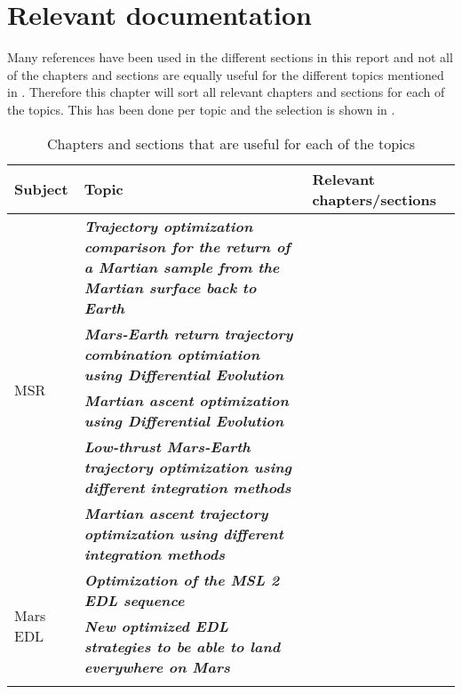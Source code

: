\chapter{Relevant documentation}
\label{ch:reldoc}
Many references have been used in the different sections in this report and not all of the chapters and sections are equally useful for the different topics mentioned in . Therefore this chapter will sort all relevant chapters and sections for each of the topics. This has been done per topic and the selection is shown in . 


\begin{longtable}{|l|p{8cm}|p{3cm}|}
\caption{Chapters and sections that are useful for each of the topics}
\label{tab:reldoc}
\endfirsthead
\endhead
\hline 
\textbf{Subject} 		& \textbf{Topic} & \textbf{Relevant chapters/sections}  \\ \hline \hline
\multirow{5}{*}{MSR} 		& \textbf{\textit{Trajectory optimization comparison for the return of a Martian sample from the Martian surface back to Earth}} & \Cref{ch:oversub,sec:srref,ch:optimization,ch:int,ch:reftrans,ch:launch,ch:transorb}  \\ \cline{2-3}
 		& \textbf{\textit{Mars-Earth return trajectory combination optimiation using Differential Evolution}} &  \Cref{ch:oversub,sec:srref,ch:optimization,ch:int,ch:reftrans,ch:launch,ch:transorb}    \\ \cline{2-3}
 		& \textbf{\textit{Martian ascent optimization using Differential Evolution}} & \Cref{ch:oversub,sec:srref,ch:optimization,ch:int,ch:reftrans,ch:launch,ch:transorb}    \\ \cline{2-3}
 		& \textbf{\textit{Low-thrust Mars-Earth trajectory optimization using different integration methods}} &  \Cref{ch:oversub,sec:srref,ch:optimization,ch:int,ch:reftrans,ch:launch,ch:transorb}   \\ \cline{2-3}
  		& \textbf{\textit{Martian ascent trajectory optimization using different integration methods}} & \Cref{ch:oversub,sec:srref,ch:optimization,ch:int,ch:reftrans,ch:launch,ch:transorb}  \\ \hline
\multirow{5}{*}{Mars EDL} 		& \textbf{\textit{Optimization of the MSL 2 EDL sequence}} & \Cref{ch:oversub,sec:mslref,ch:optimization,ch:int,ch:reftrans,ch:entry}  \\ \cline{2-3} 		
 		& \textbf{\textit{New optimized EDL strategies to be able to land everywhere on Mars}} & \Cref{ch:oversub,sec:mslref,ch:optimization,ch:int,ch:reftrans,ch:entry}\\ \cline{2-3}

\end{longtable}
